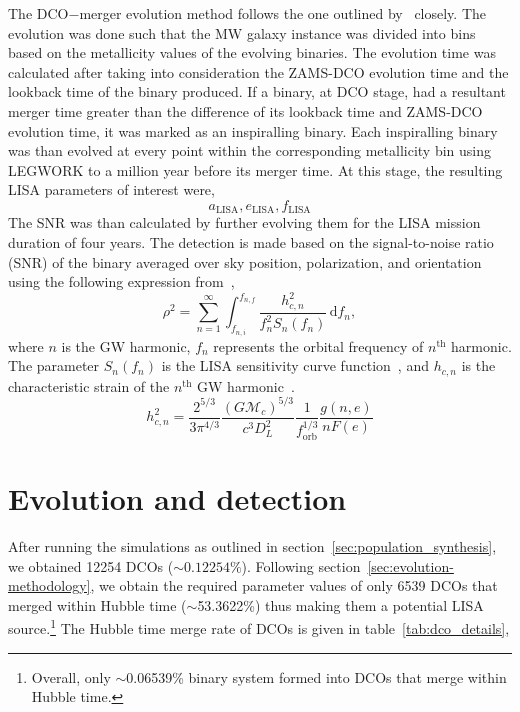 \documentclass[journal, twocolumn]{IEEEtran}
\newcommand{\semaxis}[1]{a_{\text{#1}}}
\newcommand{\ecc}[1]{e_\text{#1}}
\begin{document}
    The DCO$-$merger evolution method follows the one outlined by~\cite{wagg2021gravitational} closely.
    The evolution was done such that the MW galaxy instance was divided into bins based on the metallicity values of the evolving binaries.
    The evolution time was calculated after taking into consideration the ZAMS-DCO evolution time and the lookback time of the binary produced.
    If a binary, at DCO stage, had a resultant merger time greater than the difference of its lookback time and ZAMS-DCO evolution time, it was marked as an inspiralling binary.
    Each inspiralling binary was than evolved at every point within the corresponding metallicity bin using LEGWORK to a million year before its merger time.
    At this stage, the resulting LISA parameters of interest were,
    \begin{equation}%
        \semaxis{LISA}, \ecc{LISA}, f_{\text{LISA}}
        \label{eq:lisa_parameter_names}
    \end{equation}%
    The SNR was than calculated by further evolving them for the LISA mission duration of four years.
    The detection is made based on the signal-to-noise ratio (SNR) of the binary averaged over sky position, polarization, and orientation using the following expression from~\cite{Finn2000},
    \begin{equation}
        \rho^2 = \sum_{n=1}^{\infty}\int_{f_{n, i}}^{f_{n, f}}\frac{h_{c, n}^2}{f_n^2 S_n(f_n)}\,\text{d}f_n,
        \label{eq:snr_equation}
    \end{equation}
    where $n$ is the GW harmonic, $f_n$ represents the orbital frequency of $n^\text{th}$ harmonic.
    The parameter $S_n(f_n)$ is the LISA sensitivity curve function~\cite{Robson2019}, and $h_{c, n}$ is the characteristic strain of the $n^\text{th}$ GW harmonic~\cite{Barack2004}.
    \begin{equation}
        h_{c,n}^2 = \frac{2^{5/3}}{3\pi^{4/3}}\frac{(G\mathcal{M}_c)^{5/3}}{c^3 D_L^2}\frac{1}{f_\text{orb}^{1/3}}\frac{g(n, e)}{nF(e)}
        \label{eq:characteristic_strain}
    \end{equation}


    \section{Evolution and detection}
    \label{sec:evolution-and-detection}

    After running the simulations as outlined in section~\ref{sec:population_synthesis}, we obtained 12254 DCOs ($\sim0.12254\%$).
    Following section~\ref{sec:evolution-methodology}, we obtain the required parameter values of only 6539 DCOs that merged within Hubble time ($\sim$53.3622\%) thus making them a potential LISA source.\footnote{Overall, only $\sim$0.06539\% binary system formed into DCOs that merge within Hubble time.}
    The Hubble time merge rate of DCOs is given in table~\ref{tab:dco_details},
\end{document}
